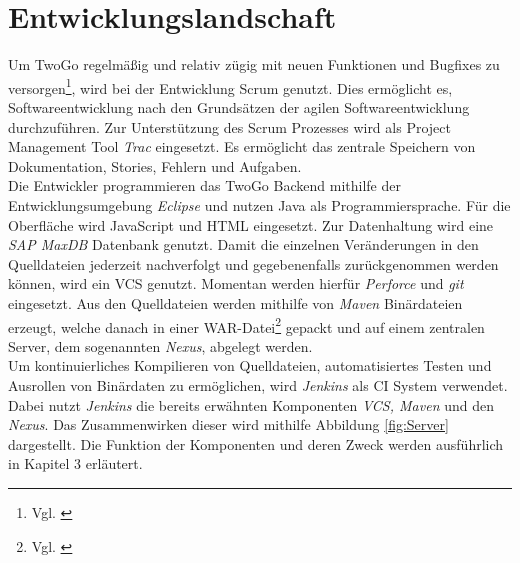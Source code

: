 




%  

\section{Entwicklungslandschaft}
Um TwoGo regelmäßig und relativ zügig mit neuen Funktionen und Bugfixes zu versorgen\footnote{Vgl. \cite{wiki}}, wird bei der Entwicklung Scrum genutzt. Dies ermöglicht es, Softwareentwicklung nach den Grundsätzen der agilen Softwareentwicklung durchzuführen. Zur Unterstützung des Scrum Prozesses wird als Project Management Tool \textit{Trac} eingesetzt. Es ermöglicht das zentrale Speichern von Dokumentation, Stories, Fehlern und Aufgaben. \\
Die Entwickler programmieren das TwoGo Backend mithilfe der Entwicklungsumgebung \textit{Eclipse} und nutzen Java als Programmiersprache. Für die Oberfläche wird JavaScript und HTML eingesetzt. Zur Datenhaltung wird eine \textit{SAP MaxDB} Datenbank genutzt. Damit die einzelnen Veränderungen in den Quelldateien jederzeit nachverfolgt und gegebenenfalls zurückgenommen werden können, wird ein \acl{VCS} genutzt. Momentan werden hierfür \textit{Perforce} und \textit{git} eingesetzt. Aus den Quelldateien werden mithilfe von \textit{Maven} Binärdateien erzeugt, welche danach in einer \acs{WAR}-Datei\footnote{Vgl. \cite[Seite 329]{danny_java_????}} gepackt  und auf einem zentralen Server, dem sogenannten \textit{Nexus}, abgelegt werden.\\
Um kontinuierliches Kompilieren von Quelldateien, automatisiertes Testen und Ausrollen von Binärdaten zu ermöglichen, wird \textit{Jenkins} als \acl{CI} System verwendet. Dabei nutzt \textit{Jenkins} die bereits erwähnten Komponenten \textit{\acs{VCS}, Maven} und den \textit{Nexus}. Das Zusammenwirken dieser wird mithilfe Abbildung \ref{fig:Server} dargestellt. Die Funktion der Komponenten und deren Zweck werden ausführlich in Kapitel 3 erläutert.%

